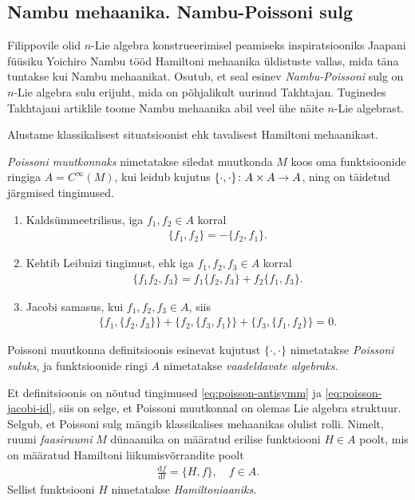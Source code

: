 \subsection{Nambu mehaanika. Nambu-Poissoni sulg}

Filippovile olid $n$-Lie algebra konstrueerimisel peamiseks
inspiratsiooniks Jaapani füüsiku Yoichiro Nambu tööd Hamiltoni mehaanika
üldistuste vallas, mida täna tuntakse kui Nambu mehaanikat. Osutub, et
seal esinev \emph{Nambu-Poissoni} sulg on $n$-Lie algebra sulu erijuht,
mida on põhjalikult uurinud Takhtajan.\cite{takhtajan1994}
Tuginedes Takhtajani artiklile toome Nambu mehaanika abil veel ühe
näite $n$-Lie algebrast.

Alustame klassikalisest situatsioonist ehk tavalisest Hamiltoni mehaanikast.

\begin{dfn}
    \emph{Poissoni muutkonnaks} nimetatakse siledat muutkonda $M$ koos oma
    funktsioonide ringiga $A = C^\infty(M)$, kui leidub kujutus
    $\{\cdot, \cdot\} \colon A \times A \to A$, ning on täidetud järgmised
    tingimused.
    \begin{enumerate}
      \item Kaldsümmeetrilisus, iga $f_1, f_2 \in A$ korral
          \begin{align}\label{eq:poisson-antisymm}
              \{f_1, f_2\} = -\{f_2, f_1\}.
          \end{align}
      \item Kehtib Leibnizi tingimust, ehk iga $f_1, f_2, f_3 \in A$ korral
          \begin{align}
              \{f_1 f_2, f_3\} = f_1 \{f_2, f_3\} + f_2 \{f_1, f_3\}.
          \end{align}
      \item Jacobi samasus, kui $f_1, f_2, f_3 \in A$, siis
          \begin{align}\label{eq:poisson-jacobi-id}
              \{f_1, \{f_2, f_3\}\} + \{f_2, \{f_3, f_1\}\} +
              \{f_3, \{f_1, f_2\}\} = 0.
          \end{align}
    \end{enumerate}
\end{dfn}

Poissoni muutkonna definitsioonis esinevat kujutust $\{\cdot, \cdot\}$
nimetatakse \emph{Poissoni suluks}, ja funktsioonide ringi $A$ nimetatakse
\emph{vaadeldavate algebraks}.

Et definitsioonis on nõutud tingimused \eqref{eq:poisson-antisymm} ja
\eqref{eq:poisson-jacobi-id}, siis on selge, et Poissoni muutkonnal on
olemas Lie algebra struktuur. Selgub, et Poissoni sulg mängib klassikalises
mehaanikas olulist rolli. Nimelt, ruumi \emph{faasiruumi} $M$ dünaamika
on määratud erilise funktsiooni $H \in A$ poolt, mis on määratud
Hamiltoni liikumisvõrrandite poolt
\begin{align*}
    \frac{\mathrm{d} f}{\mathrm{d} t} = \{H, f\}, \quad f \in A.
\end{align*}
Sellist funktsiooni $H$ nimetatakse \emph{Hamiltoniaaniks}.

